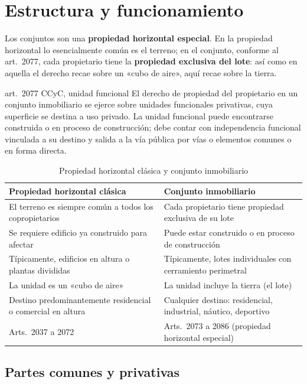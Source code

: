 \documentclass[12pt,oneside]{book}
\begin{document}
\section{Estructura y funcionamiento}

Los conjuntos son una \textbf{propiedad horizontal especial}. En la propiedad horizontal lo esencialmente común es el terreno; en el conjunto, conforme al art.~2077, cada propietario tiene la \textbf{propiedad exclusiva del lote}: así como en aquella el derecho recae sobre un «cubo de aire», aquí recae sobre la tierra.

\begin{regla}{art.~2077 CCyC, unidad funcional}
El derecho de propiedad del propietario en un conjunto inmobiliario se ejerce sobre unidades funcionales privativas, cuya superficie se destina a uso privado. La unidad funcional puede encontrarse construida o en proceso de construcción; debe contar con independencia funcional vinculada a su destino y salida a la vía pública por vías o elementos comunes o en forma directa.
\end{regla}

\begin{table}[H]
\centering
\small
\begin{tabularx}{\textwidth}{>{\raggedright\arraybackslash}X>{\raggedright\arraybackslash}X}
\toprule
\textbf{Propiedad horizontal clásica} & \textbf{Conjunto inmobiliario} \\
\midrule
El terreno es siempre común a todos los copropietarios & Cada propietario tiene propiedad exclusiva de su lote \\
Se requiere edificio ya construido para afectar & Puede estar construido o en proceso de construcción \\
Típicamente, edificios en altura o plantas divididas & Típicamente, lotes individuales con cerramiento perimetral \\
La unidad es un «cubo de aire» & La unidad incluye la tierra (el lote) \\
Destino predominantemente residencial o comercial en altura & Cualquier destino: residencial, industrial, náutico, deportivo \\
Arts.~2037 a 2072 & Arts.~2073 a 2086 (propiedad horizontal especial) \\
\bottomrule
\end{tabularx}
\caption{Propiedad horizontal clásica y conjunto inmobiliario}
\end{table}

\subsection{Partes comunes y privativas}
\end{document}
